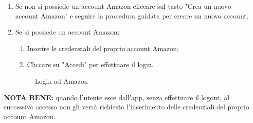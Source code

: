 \begin{enumerate}
\item Se non si possiede un account Amazon cliccare sul tasto "Crea un nuovo account Amazon" e seguire la procedura guidata per creare un nuovo account.
\item Se si possiede un account Amazon:
\begin{enumerate}
	\item Inserire le credenziali del proprio account Amazon;
	\item Cliccare su "Accedi" per effettuare il login.
\end{enumerate}
\begin{figure}[!ht]
	\centering
	\caption{Login ad Amazon}
\end{figure}
\end{enumerate}
\newpage
\textbf{NOTA BENE:} quando l'utente esce dall'app, senza effettuare il logout, al successivo accesso non gli verrà richiesto l'inserimento delle credenziali del proprio account Amazon. 
\newpage

